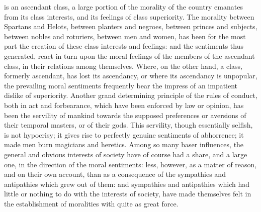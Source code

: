 \documentclass[12pt]{article}
\begin{document}
is an ascendant class, a large portion of the morality of the country emanates from its class interests, and its feelings of class superiority. The morality between Spartans and Helots, between planters and negroes, between princes and subjects, between nobles and roturiers, between men and women, has been for the most part the creation of these class interests and feelings: and the sentiments thus generated, react in turn upon the moral feelings of the members of the ascendant class, in their relations among themselves. Where, on the other hand, a class, formerly ascendant, has lost its ascendancy, or where its ascendancy is unpopular, the prevailing moral sentiments frequently bear the impress of an impatient dislike of superiority. Another grand determining principle of the rules of conduct, both in act and forbearance, which have been enforced by law or opinion, has been the servility of mankind towards the supposed preferences or aversions of their temporal masters, or of their gods. This servility, though essentially selfish, is not hypocrisy; it gives rise to perfectly genuine sentiments of abhorrence; it made men burn magicians and heretics. Among so many baser influences, the general and obvious interests of society have of course had a share, and a large one, in the direction of the moral sentiments: less, however, as a matter of reason, and on their own account, than as a consequence of the sympathies and antipathies which grew out of them: and sympathies and antipathies which had little or nothing to do with the interests of society, have made themselves felt in the establishment of moralities with quite as great force.
\end{document}
